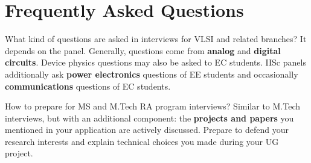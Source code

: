 \section{Frequently Asked Questions}
\label{sec:interview-faq}

\begin{faqentry}{What kind of questions are asked in interviews for VLSI and
  related branches?}
  It depends on the panel. Generally, questions come from \textbf{analog} and
  \textbf{digital circuits}. Device physics questions may also be asked to EC
  students. IISc panels additionally ask \textbf{power electronics} questions of
  EE students and occasionally \textbf{communications} questions of EC students.
\end{faqentry}

\begin{faqentry}{How to prepare for MS and M.Tech RA program interviews?}
  Similar to M.Tech interviews, but with an additional component: the
  \textbf{projects and papers} you mentioned in your application are actively
  discussed. Prepare to defend your research interests and explain technical
  choices you made during your UG project.
\end{faqentry}
